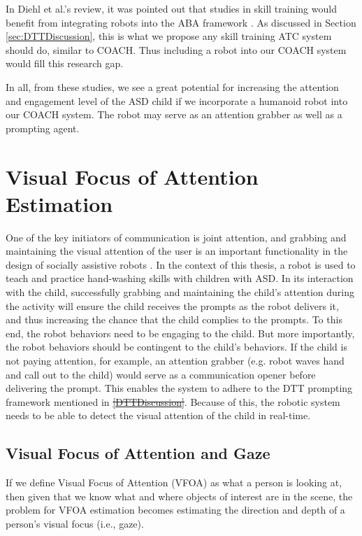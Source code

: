 \documentclass{ut-thesis}
\providecommand{\DIFaddtex}[1]{{\protect\color{blue}\uwave{#1}}} %
\providecommand{\DIFdeltex}[1]{{\protect\color{red}\sout{#1}}}                      %
\providecommand{\DIFaddbegin}{} %
\providecommand{\DIFaddend}{} %
\providecommand{\DIFdelbegin}{} %
\providecommand{\DIFdelend}{} %
\providecommand{\DIFadd}[1]{\texorpdfstring{\DIFaddtex{#1}}{#1}} %
\providecommand{\DIFdel}[1]{\texorpdfstring{\DIFdeltex{#1}}{}} %
\begin{document}
In Diehl et al.'s review, it was pointed out that studies in skill training would benefit from integrating robots into the ABA framework \cite{diehl2012clinical}.  As discussed in Section \ref{sec:DTTDiscussion}, this is what we propose any skill training ATC system should do, similar to COACH.  Thus including a robot into our COACH system would fill this research gap.


In all, from these studies, we see a great potential for increasing the attention and engagement level of the ASD child if we incorporate a humanoid robot into our COACH system.  The robot may serve as an attention grabber as well as a prompting agent.

\section{Visual Focus of Attention Estimation}
One of the key initiators of communication is joint attention, and grabbing and maintaining the visual attention of the user is an important functionality in the design of socially assistive robots \cite{torta2012can}.  In the context of this thesis, a robot is used to teach and practice hand-washing skills with children with ASD.  In its interaction with the child, successfully grabbing and maintaining the child's attention during the activity will ensure the child receives the prompts as the robot delivers it, and thus increasing the chance that the child complies to the prompts.  To this end, the robot behaviors need to be engaging to the child.  But more importantly, the robot behaviors should be contingent to the child's behaviors.  If the child is not paying attention, for example, an attention grabber (e.g. robot waves hand and call out to the child) would serve as a communication opener before delivering the prompt.  This enables the system to adhere to the DTT prompting framework mentioned in \DIFdelbegin \DIFdel{\ref{DTTDiscussion}}\DIFdelend \DIFaddbegin \DIFadd{Section \ref{sec:DTTDiscussion}}\DIFaddend .  Because of this, the robotic system needs to be able to detect the visual attention of the child in real-time.

\subsection{Visual Focus of Attention and Gaze}
If we define Visual Focus of Attention (VFOA) as what a person is looking at, then given that we know what and where objects of interest are in the scene, the problem for VFOA estimation becomes estimating the direction and depth of a person's visual focus (i.e., gaze).
\end{document}
